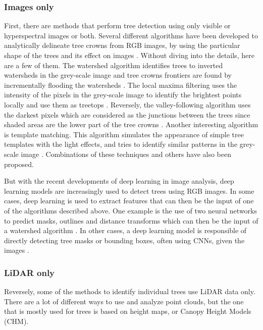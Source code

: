 \documentclass[
  letterpaper,
  DIV=11,
  numbers=noendperiod]{scrartcl}
\begin{document}
\subsubsection{Images only}\label{images-only}

First, there are methods that perform tree detection using only visible
or hyperspectral images or both. Several different algorithms have been
developed to analytically delineate tree crowns from RGB images, by
using the particular shape of the trees and its effect on images
\autocite{rgb_analytical}. Without diving into the details, here are a
few of them. The watershed algorithm identifies trees to inverted
watersheds in the grey-scale image and tree crowns frontiers are found
by incrementally flooding the watersheds \autocite{watershed}. The local
maxima filtering uses the intensity of the pixels in the grey-scale
image to identify the brightest points locally and use them as treetops
\autocite{local-maximum}. Reversely, the valley-following algorithm uses
the darkest pixels which are considered as the junctions between the
trees since shaded areas are the lower part of the tree crowns
\autocite{valley-following}. Another interesting algorithm is template
matching. This algorithm simulates the appearance of simple tree
templates with the light effects, and tries to identify similar patterns
in the grey-scale image \autocite{template-matching}. Combinations of
these techniques and others have also been proposed.

But with the recent developments of deep learning in image analysis,
deep learning models are increasingly used to detect trees using RGB
images. In some cases, deep learning is used to extract features that
can then be the input of one of the algorithms described above. One
example is the use of two neural networks to predict masks, outlines and
distance transforms which can then be the input of a watershed algorithm
\autocite{rgb-dl-watershed}. In other cases, a deep learning model is
responsible of directly detecting tree masks or bounding boxes, often
using CNNs, given the images \autocite{DeepForest}.

\subsubsection{LiDAR only}\label{lidar-only}

Reversely, some of the methods to identify individual trees use LiDAR
data only. There are a lot of different ways to use and analyze point
clouds, but the one that is mostly used for trees is based on height
maps, or Canopy Height Models (CHM).
\end{document}
